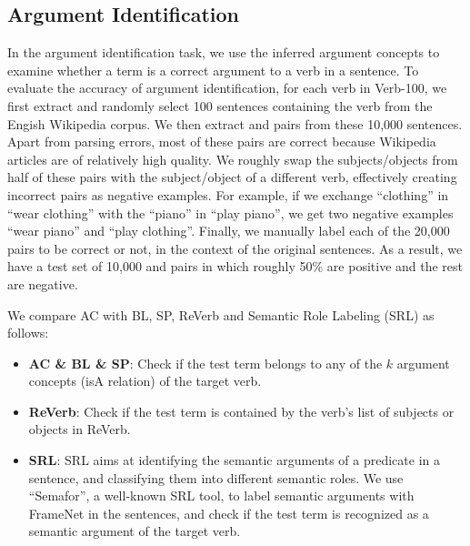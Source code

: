 \subsection{Argument Identification}

In the argument identification task, we use the inferred argument concepts
to examine whether a term is a correct argument to a verb in a sentence.
To evaluate the accuracy of argument identification, for each verb in Verb-100,
we first extract and randomly select 100 sentences containing the verb from the Engish Wikipedia
corpus. We then extract  and  pairs from these 10,000 sentences.
Apart from parsing errors, most of these pairs are correct
because Wikipedia articles are of relatively high quality.
We roughly swap the subjects/objects from half of these pairs with
the subject/object of a different verb, effectively creating
incorrect pairs as negative examples.
For example, if we exchange ``clothing'' in ``wear clothing'' with the ``piano''
in ``play piano'', we get two negative examples ``wear piano''
and ``play clothing''.
Finally, we manually label each of the 20,000 pairs to be correct or not,
in the context of the original sentences.  As a result, we have a test
set of 10,000  and  pairs in which
roughly 50\% are positive and the rest are negative.

We compare AC with BL, SP, ReVerb and Semantic Role Labeling (SRL) as follows:
\begin{itemize}
\item {\bf AC \& BL \& SP}: Check if the test term belongs to any of the $k$ argument concepts (isA relation) of the target verb.
\item {\bf ReVerb}: Check if the test term is contained by the
verb's list of subjects or objects in ReVerb.
\item {\bf SRL}: SRL aims at identifying the semantic arguments
of a predicate in a sentence, and classifying them into different
semantic roles.
We use ``Semafor''\cite{chen2010semafor}, a well-known SRL tool,
to label semantic arguments with FrameNet in the sentences,
and check if the test term is recognized as a semantic argument of
the target verb.
\end{itemize}

